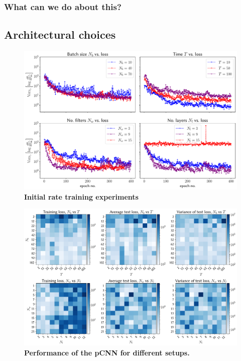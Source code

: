 \subsubsection{What can we do about this?}

\subsection{Architectural choices}
\begin{figure}[H]
	\centering
	\includegraphics[width=\linewidth]{Chapter5/Figs/Vector/init_test_learning}
	\caption[Initial rate training experiments]{\textbf{Initial rate training experiments}}
	\label{fig:inittestlearning}
\end{figure}

\begin{figure}[H]
	\centering
	\includegraphics[width=\linewidth]{Chapter5/Figs/Raster/avg_var_loss}
	\caption[Performance of the pCNN for different setups]{\textbf{Performance of the pCNN for different setups.}}
	\label{fig:avgvarloss}
\end{figure}

